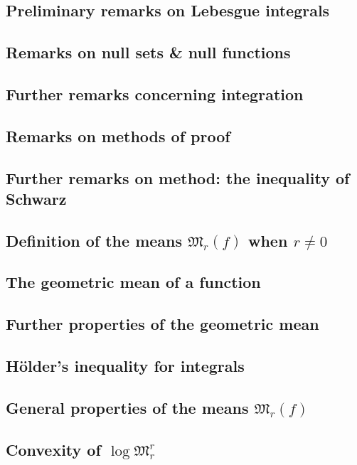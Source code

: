\documentclass[oneside]{book}
\numberwithin{equation}{section}
\begin{document}
\subsection{Preliminary remarks on Lebesgue integrals}

\subsection{Remarks on null sets \& null functions}

\subsection{Further remarks concerning integration}

\subsection{Remarks on methods of proof}

\subsection{Further remarks on method: the inequality of Schwarz}

\subsection{Definition of the means $\mathfrak{M}_r(f)$ when $r\ne 0$}

\subsection{The geometric mean of a function}

\subsection{Further properties of the geometric mean}

\subsection{H\"older's inequality for integrals}

\subsection{General properties of the means $\mathfrak{M}_r(f)$}

\subsection{Convexity of $\log\mathfrak{M}_r^r$}
\end{document}

